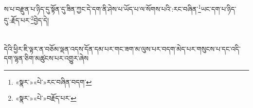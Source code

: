ས་པ་བརྫུན་པ་ཉིད་དུ་སྟོན་དུ་ཟིན་ཀྱང་དེ་དག་ནི་ཤེས་པ་ཡོད་པ་ལ་སོགས་པའི་:རང་བཞིན་\footnote{«སྣར་»«པེ་»རང་བཞིན་བདག་}ཡང་དག་པ་ཉིད་དུ་:རྗོད་པར་\footnote{«སྣར་»«པེ་»བརྗོད་པར་}བྱེད་དེ།\chapter{ }དེའི་ཕྱིར་ཇི་ལྟར་ན་བཅོམ་ལྡན་འདས་དོན་དམ་པར་གང་ཟག་མ་ལུས་པར་བདག་མེད་པར་གསུངས་པ་དང་འདི་དག་ལྷན་ཅིག་མཚུངས་པར་འགྱུར་ཞེས